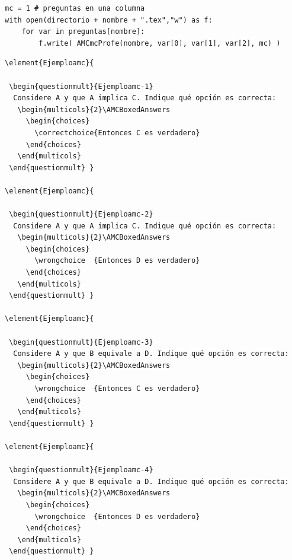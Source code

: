 \documentclass[10pt,a4paper]{report}
\begin{document}
\begin{enumerate}
\begin{verbatim}
mc = 1 # preguntas en una columna
with open(directorio + nombre + ".tex","w") as f:
    for var in preguntas[nombre]:
        f.write( AMCmcProfe(nombre, var[0], var[1], var[2], mc) )
\end{verbatim}

{\footnotesize
\begin{verbatim}
\element{Ejemploamc}{

 \begin{questionmult}{Ejemploamc-1}
  Considere A y que A implica C. Indique qué opción es correcta: 
   \begin{multicols}{2}\AMCBoxedAnswers
     \begin{choices}
       \correctchoice{Entonces C es verdadero}
     \end{choices}
   \end{multicols}
 \end{questionmult} }

\element{Ejemploamc}{

 \begin{questionmult}{Ejemploamc-2}
  Considere A y que A implica C. Indique qué opción es correcta: 
   \begin{multicols}{2}\AMCBoxedAnswers
     \begin{choices}
       \wrongchoice  {Entonces D es verdadero}
     \end{choices}
   \end{multicols}
 \end{questionmult} }

\element{Ejemploamc}{

 \begin{questionmult}{Ejemploamc-3}
  Considere A y que B equivale a D. Indique qué opción es correcta: 
   \begin{multicols}{2}\AMCBoxedAnswers
     \begin{choices}
       \wrongchoice  {Entonces C es verdadero}
     \end{choices}
   \end{multicols}
 \end{questionmult} }

\element{Ejemploamc}{

 \begin{questionmult}{Ejemploamc-4}
  Considere A y que B equivale a D. Indique qué opción es correcta: 
   \begin{multicols}{2}\AMCBoxedAnswers
     \begin{choices}
       \wrongchoice  {Entonces D es verdadero}
     \end{choices}
   \end{multicols}
 \end{questionmult} }


\end{verbatim}}
\end{enumerate}
\end{document}
